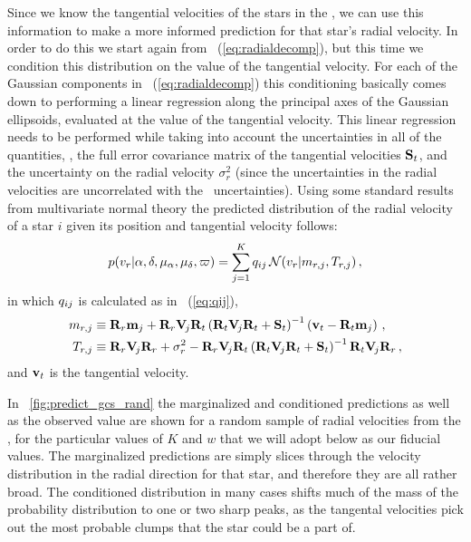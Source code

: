 Since we know the tangential velocities of the stars in the \gcsabb,
we can use this information to make a more informed prediction for
that star's radial velocity. In order to do this we start again from
\eqnnumber~(\ref{eq:radialdecomp}), but this time we condition this
distribution on the value of the tangential velocity. For each of the
Gaussian components in \eqnnumber~(\ref{eq:radialdecomp}) this
conditioning basically comes down to performing a linear regression
along the principal axes of the Gaussian ellipsoids, evaluated at the
value of the tangential velocity. This linear regression needs to be
performed while taking into account the uncertainties in all of the
quantities, \ie, the full error covariance matrix of the tangential
velocities $\mathbf{S}_t$, and the uncertainty on the radial velocity
$\sigma_r^2$ (since the uncertainties in the radial velocities are
uncorrelated with the \Hipparcos\ uncertainties). Using some standard
results from multivariate normal theory the predicted distribution of
the radial velocity of a star $i$ given its position and tangential
velocity follows:
\begin{equation}\label{eq:condpredicted}
p(v_r|\alpha,\delta,\mu_{\alpha},\mu_{\delta},\varpi) = \sum_{j=1}^K q_{ij}\,
\mathcal{N}(v_r|m_{r,j},T_{r,j})\, ,
\end{equation}
in which $q_{ij}$ is calculated as in \eqnnumber~(\ref{eq:qij}),
\begin{align}
m_{r,j}&\equiv\mathbf{R}_r \mathbf{m}_j + \mathbf{R}_r \mathbf{V}_{\!j}\mathbf{R}_t  
\left( \mathbf{R}_t \mathbf{V}_{\!j}\mathbf{R}_t  + \mathbf{S}_t\right)^{-1}
\left(\boldsymbol{\mathbf{v}}_t-\mathbf{R}_t \mathbf{m}_j\right)\, ,\\
T_{r,j}&\equiv\mathbf{R}_r \mathbf{V}_{\!j}\mathbf{R}_r +\sigma_r^2- \mathbf{R}_r \mathbf{V}_{\!j}\mathbf{R}_t 
\left( \mathbf{R}_t \mathbf{V}_{\!j}\mathbf{R}_t  + \mathbf{S}_t\right)^{-1} 
\mathbf{R}_t \mathbf{V}_{\!j}\mathbf{R}_r
\, ,
\end{align}
and $\boldsymbol{\mathbf{v}}_t$ is the tangential velocity.

In \figurename~\ref{fig:predict_gcs_rand} the marginalized and
conditioned predictions as well as the observed value are shown for a
random sample of radial velocities from the \gcsabb, for the
particular values of $K$ and $w$ that we will adopt below as our
fiducial values. The marginalized predictions are simply slices
through the velocity distribution in the radial direction for that
star, and therefore they are all rather broad. The conditioned
distribution in many cases shifts much of the mass of the probability
distribution to one or two sharp peaks, as the tangental velocities
pick out the most probable clumps that the star could be a part of.

